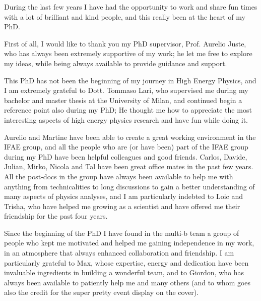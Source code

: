 \par\bigskip  
\par\bigskip

During the last few years I have had the opportunity to work and share fun times with a lot 
of brilliant and kind people, and this really been at the heart of my PhD. 

\par\bigskip 

First of all, I would like to thank you my PhD supervisor, Prof. Aurelio Juste, who has always been 
extremely supportive of my work; 
he let me free to explore my ideas, while being always available to provide guidance and support. 

\par\bigskip 

This PhD has not been the beginning of my journey in High Energy Physics, and I am extremely grateful to 
Dott. Tommaso Lari, who supervised me during my bachelor and master thesis at the University of Milan, 
and continued begin a reference point also during my PhD; 
He thought me how to appreciate the most interesting aspects of high energy physics research 
and have fun while doing it.  

\par\bigskip 
 
Aurelio and Martine have been able to create a great working environment in the IFAE group, and 
all the people who are (or have been) part of the IFAE group during my PhD have been helpful colleagues and 
good friends.  
Carlos, Davide, Julian, Mirko, Nicola and Tal have been great office mates in the past few years.  
All the post-docs in the group have always been available to help me with 
anything from technicalities to long discussions to gain a better understanding of many aspects of physics analyses, 
and I am particularly indebted to Loic and Trisha, who have helped me growing as a scientist and have offered me 
their friendship for the past four years. 

\par\bigskip

Since the beginning of the PhD I have found in the multi-b team a 
group of people who kept me motivated and helped me 
gaining independence in my work, 
in an atmosphere that always enhanced collaboration and friendship.  
I am particularly grateful to Max, whose expertise, energy and dedication have been 
invaluable ingredients in building a wonderful team, 
and to Giordon, who has always been available to patiently help me and many others (and 
to whom goes also the credit for the super pretty event display on the cover). 

